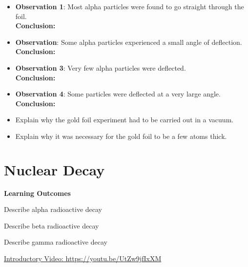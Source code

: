 \documentclass[12pt]{report}
\begin{document}
\begin{itemize}
	\item \textbf{Observation 1}: Most alpha particles were found to go straight through the foil.\\
	\textbf{Conclusion:}\vspace{1cm}
	\item \textbf{Observation}: Some alpha particles experienced a small angle of deflection. \\
	\textbf{Conclusion:}\vspace{1cm}
	\item \textbf{Observation 3}: Very few alpha particles were deflected. \\
	\textbf{Conclusion:}\vspace{1cm}
	\item \textbf{Observation 4}: Some particles were deflected at a very large angle. \\
	\textbf{Conclusion:}\vspace{1cm}
	\item Explain why the gold foil experiment had to be carried out in a vacuum.\vspace{2cm}
	\item Explain why it was necessary for the gold foil to be a few atoms thick.\vspace{2cm}
\end{itemize}

\newpage
\chapter{Nuclear Decay}

\noindent\textbf{Learning Outcomes}
\begin{nwa}
	\item Describe alpha radioactive decay
	\item Describe beta radioactive decay
	\item Describe gamma radioactive decay
\end{nwa}

\noindent\href{https://youtu.be/UtZw9jfIxXM}{Introductory Video: https://youtu.be/UtZw9jfIxXM}
\end{document}
